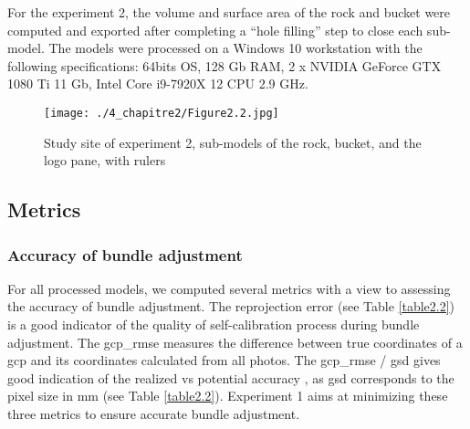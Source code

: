 For the experiment 2, the volume and surface area of the rock and bucket were computed and exported after completing a “hole filling” step to close each sub-model. The models were processed on a Windows 10 workstation with the following specifications: 64bits OS, 128 Gb RAM, 2 x NVIDIA GeForce GTX 1080 Ti 11 Gb, Intel Core i9-7920X 12 CPU 2.9 GHz.

\begin{figure}[H]
	\begin{center}
	\texttt{[image: ./4\_chapitre2/Figure2.2.jpg]}
		\caption[Study site of experiment 2]{Study site of experiment 2, sub-models of the rock, bucket, and the logo pane, with rulers}
	\label{figure2.2}
\end{center}
\end{figure}

\subsection{Metrics}\label{chapitre2_2.3}

\subsubsection{Accuracy of bundle adjustment}\label{chapitre2_2.3.1}
For all processed models, we computed several metrics with a view to assessing the accuracy of bundle adjustment. The reprojection error (see Table \ref{table2.2}) is a good indicator of the quality of self-calibration process during bundle adjustment. The \gls{gcp_rmse} measures the difference between true coordinates of a \gls{gcp} and its coordinates calculated from all photos. The \acrshort{gcp_rmse} / \gls{gsd} gives good indication of the realized vs potential accuracy \citep{forstner_photogrammetric_2016}, as \acrshort{gsd} corresponds to the pixel size in mm (see Table \ref{table2.2}). Experiment 1 aims at minimizing these three metrics to ensure accurate bundle adjustment.

